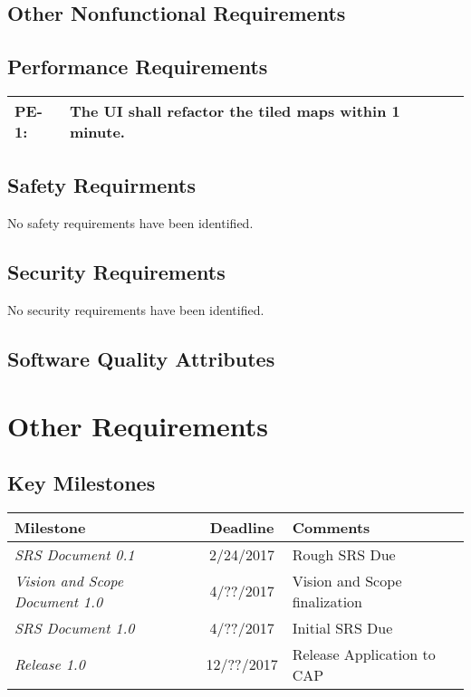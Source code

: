 \documentclass[12pt, letterpaper]{article}
\begin{document}
\subsection{Other Nonfunctional Requirements}
  \subsection{Performance Requirements}
    \begin{tabularx}{\textwidth}{|l|X|} \hline
      PE-1: & The UI shall refactor the tiled maps within 1 minute. \\ \hline
    \end{tabularx}

  \subsection{Safety Requirments}
  No safety requirements have been identified.
  \subsection{Security Requirements}
  No security requirements have been identified.
  \subsection{Software Quality Attributes}

\section{Other Requirements}
  \subsection{Key Milestones}
  \begin{tabularx}{\textwidth}{l c l}
    \hline
    \textbf{Milestone} & \textbf{Deadline} & \textbf{Comments}\\
    \hline
    \textit{SRS Document 0.1} & 2/24/2017 & Rough SRS Due \\
    \textit{Vision and Scope Document 1.0} & 4/??/2017 & Vision and Scope finalization \\
    \textit{SRS Document 1.0} & 4/??/2017 & Initial SRS Due \\
    \textit{Release 1.0} & 12/??/2017 & Release Application to CAP \\
    \hline
  \end{tabularx}
\appendix
\end{document}
